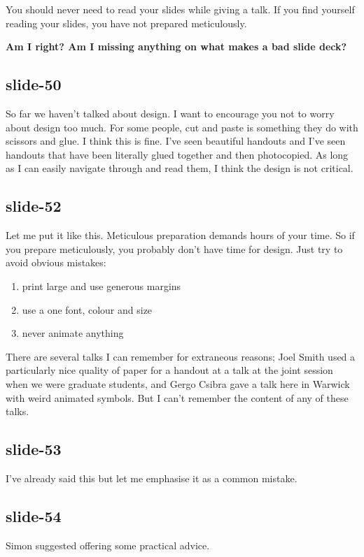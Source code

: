 \documentclass[12pt,\papersize]{extarticle}
\begin{document}
You should never need to read your slides while giving a talk.
If you find yourself reading your slides, you have not prepared meticulously.

\textbf{Am I right?  Am I missing anything on what makes a bad slide deck?}
 
\subsection{slide-50}
So far we haven't talked about design.  
I want to encourage you not to worry about design too much.
For some people, cut and paste is something they do with scissors and glue.
I think this is fine.
I've seen beautiful handouts and I've seen handouts that have been literally glued together and
then photocopied.  As long as I can easily navigate through and read them, I think the design is not 
critical.
 
\subsection{slide-52}
Let me put it like this.
Meticulous preparation demands hours of your time.
So if you prepare meticulously, you probably don't have time for design.
Just try to avoid obvious mistakes:
\begin{enumerate}
\item print large and use generous margins
\item use a one font, colour and size 
\item never animate anything
\end{enumerate}
 
There are several talks I can remember for extraneous reasons; Joel Smith used a particularly nice
quality of paper for a handout at a talk at the joint session when we were graduate students,
and Gergo Csibra gave a talk here in Warwick with weird animated symbols.
But I can't remember the content of any of these talks.
 
\subsection{slide-53}
I've already said this but let me emphasise it as a common mistake.
 
\subsection{slide-54}
Simon suggested offering some practical advice.
 
\end{document}
